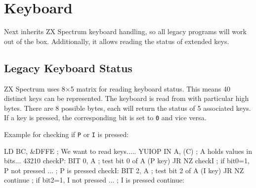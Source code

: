 \section{Keyboard}
\label{zx_next_keyboard}


Next inherits ZX Spectrum keyboard handling, so all legacy programs will work out of the box. Additionally, it allows reading the status of extended keys.


\subsection{Legacy Keyboard Status}

ZX Spectrum uses 8$\times$5 matrix for reading keyboard status. This means 40 distinct keys can be represented. The keyboard is read from  with particular high bytes. There are 8 possible bytes, each will return the status of 5 associated keys. If a key is pressed, the corresponding bit is set to {\tt 0} and vice versa.

Example for checking if {\tt P} or {\tt I} is pressed:
	
\begin{tcblisting}{}
	LD BC, &DFFE     ; We want to read keys..... YUIOP
	IN A, (C)        ; A holds values in bits... 43210
checkP:
	BIT 0, A         ; test bit 0 of A (P key)
	JR NZ checkI     ; if bit0=1, P not pressed
	...              ; P is pressed
checkI:
	BIT 2, A         ; test bit 2 of A (I key)
	JR NZ continue   ; if bit2=1, I not pressed
	...              ; I is pressed
continue:
\end{tcblisting}

